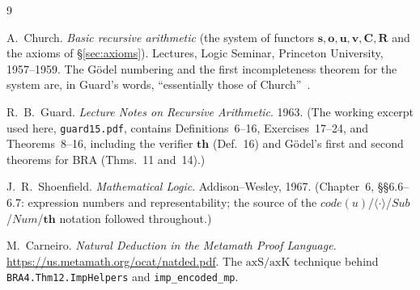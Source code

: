 \documentclass[11pt]{article}
\theoremstyle{plain}
\theoremstyle{definition}
\theoremstyle{remark}
\newcommand{\code}[1]{\mathit{code}(#1)}
\newcommand{\seq}[1]{\langle #1 \rangle}
\newcommand{\Sub}{\mathit{Sub}}
\newcommand{\Num}{\mathit{Num}}
\begin{document}
\begin{thebibliography}{9}

A.~Church.
\emph{Basic recursive arithmetic} (the system of functors
$\mathbf{s},\mathbf{o},\mathbf{u},\mathbf{v},\mathbf{C},\mathbf{R}$ and
the axioms of {\S}\ref{sec:axioms}).
Lectures, Logic Seminar, Princeton University, 1957--1959.
The G\"odel numbering and the first incompleteness theorem for the
system are, in Guard's words, ``essentially those of
Church''~\cite[p.~13]{Guard1963}.

R.~B.~Guard.
\emph{Lecture Notes on Recursive Arithmetic}.
1963.
(The working excerpt used here, \texttt{guard15.pdf}, contains
Definitions~6--16, Exercises~17--24, and Theorems~8--16, including the
verifier $\mathbf{th}$ (Def.~16) and G\"odel's first and second theorems
for BRA (Thms.~11 and~14).)

J.~R.~Shoenfield.
\emph{Mathematical Logic}.
Addison--Wesley, 1967.
(Chapter~6, {\S}{\S}6.6--6.7: expression numbers and representability;
the source of the $\code{u}$/$\seq{\cdot}$/$\Sub$/$\Num$/$\mathbf{th}$
notation followed throughout.)

M.~Carneiro.
\emph{Natural Deduction in the Metamath Proof Language}.
\url{https://us.metamath.org/ocat/natded.pdf}.
The $\mathrm{axS}/\mathrm{axK}$ technique behind
\texttt{BRA4.Thm12.ImpHelpers} and \texttt{imp\_encoded\_mp}.

\end{thebibliography}
\end{document}
